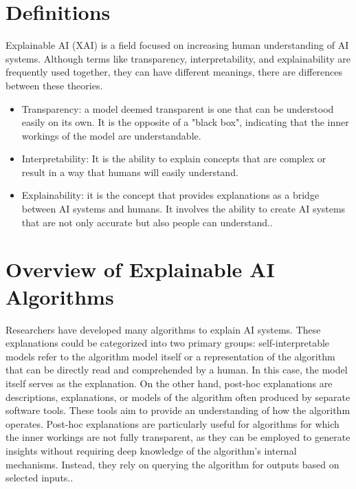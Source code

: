 \documentclass[10pt,journal,compsoc]{IEEEtran}
\begin{document}
\section{Definitions}

Explainable AI (XAI) is a field focused on increasing human understanding of AI systems. Although terms like transparency, interpretability, and explainability are frequently used together, they can have different meanings, there are differences between these theories.\cite{antoniadi2021current}

\begin{itemize}
    \item {Transparency}: a model deemed transparent is one that can be understood easily on its own. It is the opposite of a "black box", indicating that the inner workings of the model are understandable\cite{transparency}.
    \item {Interpretability}: It is the ability to explain concepts that are complex or result in a way that humans will easily understand\cite{gilpin2019explaining}.
    \item {Explainability}: it is the concept that provides explanations as a bridge between AI systems and humans. It involves the ability to create AI systems that are not only accurate but also people can understand.\cite{gilpin2019explaining}.
\end{itemize}

\section{Overview of Explainable AI Algorithms}
Researchers have developed many algorithms to explain AI systems. These explanations could be categorized into two primary groups: self-interpretable models refer to the algorithm model itself or a representation of the algorithm that can be directly read and comprehended by a human. In this case, the model itself serves as the explanation. On the other hand, post-hoc explanations are descriptions, explanations, or models of the algorithm often produced by separate software tools. These tools aim to provide an understanding of how the algorithm operates. Post-hoc explanations are particularly useful for algorithms for which the inner workings are not fully transparent, as they can be employed to generate insights without requiring deep knowledge of the algorithm's internal mechanisms. Instead, they rely on querying the algorithm for outputs based on selected inputs.\cite{phillips2020four}.
\end{document}
